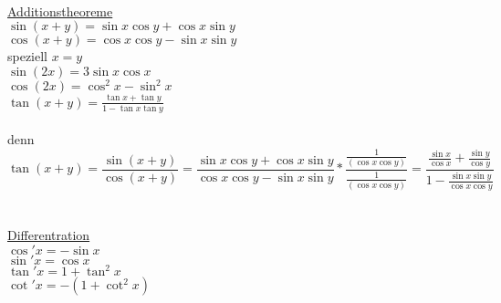 \documentclass[14pt,a4paper]{article}
\begin{document}
\\\\\\
\underline{Additionstheoreme}\\
$
\sin(x+y) = \sin x \cos y + \cos x \sin y $ \\ $
\cos(x+y) = \cos x \cos y - \sin x \sin y $ \\ 
speziell $ x=y $ \\ $
\sin(2x) = 3 \sin x \cos x $ \\ $
\cos(2x) = \cos^2 x - \sin^2 x $ \\ $ 
\tan(x+y) = \frac{\tan x + \tan y}{1-\tan x \tan y} $ \\\\ denn \[
\tan(x+y) = \frac{\sin(x+y)}{\cos(x+y)} = \frac{\sin x \cos y + \cos x \sin y}{\cos x \cos y - \sin x \sin y} * \frac{\frac{1}{(\cos x \cos y)}}{\frac{1}{(\cos x \cos y)}} 
= \frac{\frac{\sin x}{\cos x}+ \frac{\sin y}{\cos y}}{1- \frac{\sin x \sin y}{\cos x \cos y}} \] \\\\
\underline{Differentration} \\ $
\cos 'x = -\sin x $ \\ $
\sin 'x = \cos x $ \\ $
\tan 'x = 1 + \tan^2 x $ \\ $
\cot 'x = -(1+\cot^2 x) $ \\

\end{document}
